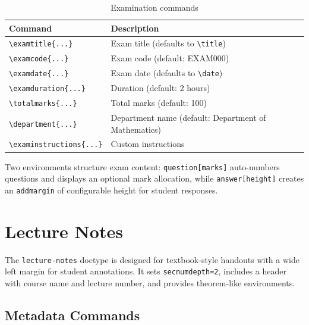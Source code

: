 \begin{table}[htbp]
    \centering
    \caption{Examination commands}
    \label{tab:exam-commands}
    \begin{tabular}{@{} l p{7.5cm} @{}}
        \toprule
        \textbf{Command} & \textbf{Description} \\
        \midrule
        \texttt{\textbackslash examtitle\{...\}}        & Exam title (defaults to \texttt{\textbackslash title}) \\
        \texttt{\textbackslash examcode\{...\}}         & Exam code (default: EXAM000) \\
        \texttt{\textbackslash examdate\{...\}}         & Exam date (defaults to \texttt{\textbackslash date}) \\
        \texttt{\textbackslash examduration\{...\}}     & Duration (default: 2 hours) \\
        \texttt{\textbackslash totalmarks\{...\}}       & Total marks (default: 100) \\
        \texttt{\textbackslash department\{...\}}       & Department name (default: Department of Mathematics) \\
        \texttt{\textbackslash examinstructions\{...\}} & Custom instructions \\
        \bottomrule
    \end{tabular}
\end{table}

Two environments structure exam content:
\texttt{question[marks]} auto-numbers questions and displays an optional
mark allocation, while \texttt{answer[height]} creates an
\texttt{addmargin} of configurable height for student responses.

\section{Lecture Notes}
\label{sec:lecture-notes}

The \texttt{lecture-notes} doctype is designed for textbook-style handouts
with a wide left margin for student annotations.  It sets
\texttt{secnumdepth=2}, includes a header with course name and lecture
number, and provides theorem-like environments.

\subsection{Metadata Commands}

